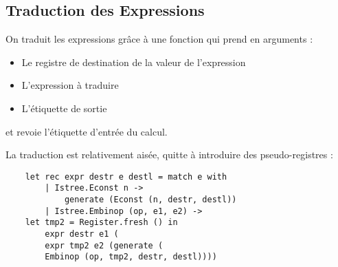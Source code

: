 \documentclass{cours}
\begin{document}
\subsection{Traduction des Expressions}
On traduit les expressions grâce à une fonction qui prend en arguments : 
\begin{itemize}
    \item Le registre de destination de la valeur de l'expression
    \item L'expression à traduire
    \item L'étiquette de sortie
\end{itemize}
et revoie l'étiquette d'entrée du calcul. 

La traduction est relativement aisée, quitte à introduire des pseudo-registres : 
\begin{verbatim}
    let rec expr destr e destl = match e with
        | Istree.Econst n ->
            generate (Econst (n, destr, destl))
        | Istree.Embinop (op, e1, e2) ->
    let tmp2 = Register.fresh () in
        expr destr e1 (
        expr tmp2 e2 (generate (
        Embinop (op, tmp2, destr, destl))))
\end{verbatim}
\end{document}
